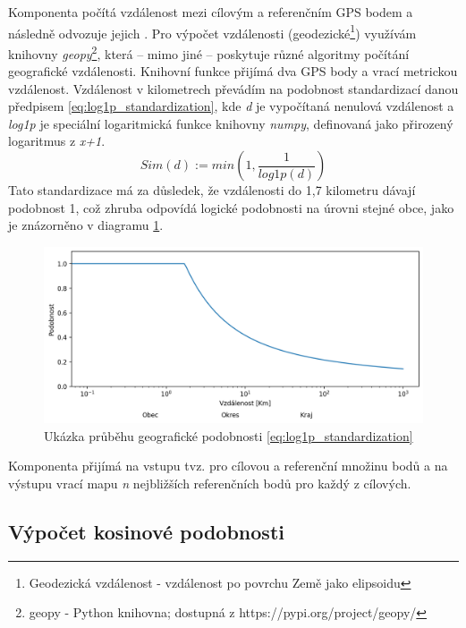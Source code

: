 \documentclass[thesis=M,czech]{FITthesis}[2019/12/23]
\begin{document}
Komponenta počítá vzdálenost mezi cílovým a referenčním GPS bodem a následně odvozuje jejich . Pro výpočet vzdálenosti (geodezické\footnote{Geodezická vzdálenost - vzdálenost po povrchu Země jako elipsoidu}) využívám knihovny \textit{geopy}\footnote{geopy - Python knihovna; dostupná z https://pypi.org/project/geopy/}, která -- mimo jiné -- poskytuje různé algoritmy počítání geografické vzdálenosti. Knihovní funkce přijímá dva GPS body a vrací metrickou vzdálenost. Vzdálenost v kilometrech převádím na podobnost standardizací danou předpisem \ref{eq:log1p_standardization}, kde \textit{d} je vypočítaná nenulová vzdálenost a \textit{log1p} je speciální logaritmická funkce knihovny \textit{numpy}, definovaná jako přirozený logaritmus z \textit{x+1}.
\begin{equation} \label{eq:log1p_standardization}
Sim(d) := min(1, \frac{1}{log1p(d)})
\end{equation}
Tato standardizace má za důsledek, že vzdálenosti do 1,7 kilometru dávají podobnost 1, což zhruba odpovídá logické podobnosti na úrovni stejné obce, jako je znázorněno v diagramu \ref{fig:log1pstandardization}.
\begin{figure}\centering
	\includegraphics[width=\textwidth]{images/log1p_standardization.png}
	\caption{Ukázka průběhu geografické podobnosti \ref{eq:log1p_standardization}}\label{fig:log1pstandardization}
\end{figure}

Komponenta přijímá na vstupu tvz.  pro cílovou a referenční množinu bodů a na výstupu vrací mapu \textit{n} nejbližších referenčních bodů pro každý z cílových.
    
\subsection{Výpočet kosinové podobnosti}
\label{sec:component_cosine_similarity}
\end{document}
